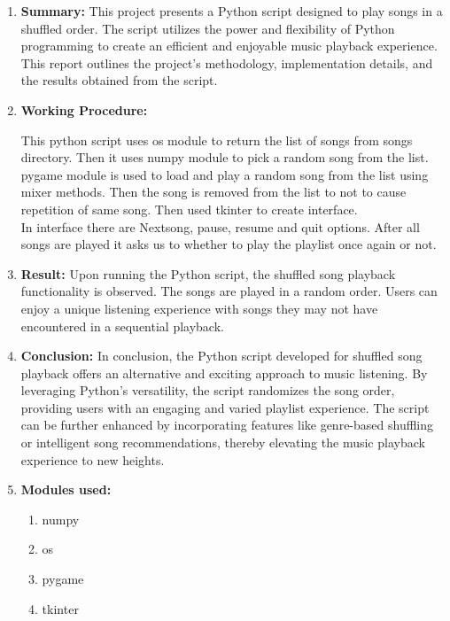 \documentclass[12pt, journal]{IEEEtran}
\begin{document}
		\maketitle
		\begin{enumerate}[label=(\roman*)]
		\item	\textbf{Summary:}
		This project presents a Python script designed to play songs in a shuffled order. The script utilizes the power and flexibility of Python programming to create an efficient and enjoyable music 			playback experience. This report outlines the project's methodology, implementation details, and the results obtained from the script.\\
		
		\item \textbf{Working Procedure:}
		
		This python script uses os module to return the list of songs from songs directory. Then it uses numpy module to pick a random song from the list.			 
		pygame module is used to load and play a random song from the list using mixer methods. 
		  Then the song is removed from the list to not to cause repetition of same song.
		  Then used tkinter to create interface.\\
		  In interface there are Nextsong, pause, resume and quit options.
		 After all songs are played it asks us to whether to play the playlist once again or not.\\
		  \item \textbf{Result:}
	Upon running the Python script, the shuffled song playback functionality is observed. The songs are played in a random order. Users can enjoy a unique listening experience with songs they may not have 		 encountered in a sequential playback.\\
		 \item \textbf{Conclusion:}
		 In conclusion, the Python script developed for shuffled song playback offers an alternative and exciting approach to music listening. 
		 By leveraging Python's versatility, the script randomizes the song order, providing users with an engaging and varied playlist experience.
		  The script can be further enhanced by incorporating features like genre-based shuffling or intelligent song recommendations, thereby elevating the music playback experience to new heights.\\
		  
		\item	\textbf{Modules used:}
			\begin{enumerate}
				\item numpy
				\item os
				\item pygame
				\item tkinter
			\end{enumerate}
		

\end{enumerate}
\end{document}
